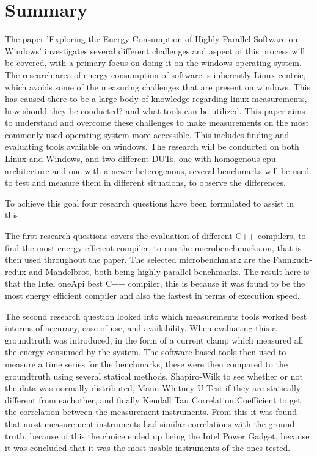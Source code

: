 \section*{Summary}
The paper 'Exploring the Energy Consumption of Highly Parallel Software on Windows' investigates several different challenges and aspect of this process will be covered, with a primary focus on doing it on the windows operating system. The research area of energy consumption of software is inherently Linux centric, which avoids some of the measuring challenges that are present on windows. This has caused there to be a large body of knowledge regarding linux measurements, how should they be conducted? and what tools can be utilized. This paper aims to understand and overcome these challenges to make measurements on the most commonly used operating system more accessible. This includes finding and evaluating tools available on windows. The research will be conducted on both Linux and Windows, and two different DUTs, one with homogenous cpu architecture and one with a newer heterogenous, several benchmarks will be used to test and measure them in different situations, to observe the differences. 

To achieve this goal four research questions have been formulated to assist in this. 


The first research questions covers the evaluation of different C++ compilers, to find the most energy efficient compiler, to run the microbenchmarks on, that is then used throughout the paper. The selected microbenchmark are the Fannkuch-redux and Mandelbrot, both being highly parallel benchmarks. The result here is that the Intel oneApi best C++ compiler, this is because it was found to be the most energy efficient compiler and also the fastest in terms of execution speed.

The second research question looked into which measurements tools worked best interms of accuracy, ease of use, and availability. When evaluating this a groundtruth was introduced, in the form of a current clamp which measured all the energy consumed by the system. The software based tools then used to measure a time series for the benchmarks, these were then compared to the groundtruth using several statical methods, Shapiro-Wilk to see whether or not the data was normally distributed, Mann-Whitney U Test if they are statically different from eachother, and finally Kendall Tau Correlation Coefficient to get the correlation between the measurement instruments. From this it was found that most measurement instruments had similar correlations with the ground truth, because of this the choice ended up being the Intel Power Gadget, because it was concluded that it was the most usable instruments of the ones tested.

